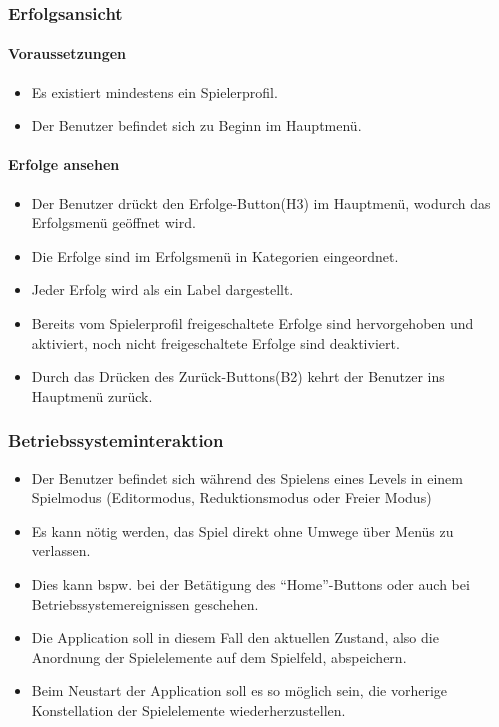 \subsubsection{Erfolgsansicht}
\paragraph{Voraussetzungen}
\begin{itemize}
	\item Es existiert mindestens ein Spielerprofil.
	\item Der Benutzer befindet sich zu Beginn im Hauptmenü.
\end{itemize}
\paragraph{Erfolge ansehen}
\begin{itemize}
	\item Der Benutzer drückt den Erfolge-Button(H3) im Hauptmenü, wodurch das Erfolgsmenü geöffnet wird.
	\item Die Erfolge sind im Erfolgsmenü in Kategorien eingeordnet.
	\item Jeder Erfolg wird als ein Label dargestellt.
	\item Bereits vom Spielerprofil freigeschaltete Erfolge sind hervorgehoben und aktiviert, noch nicht freigeschaltete Erfolge sind deaktiviert.
	\item Durch das Drücken des Zurück-Buttons(B2) kehrt der Benutzer ins Hauptmenü zurück.
\end{itemize}


\subsubsection{Betriebssysteminteraktion}
\begin{itemize}
	\item Der Benutzer befindet sich während des Spielens eines Levels in einem Spielmodus (Editormodus, Reduktionsmodus oder Freier Modus) %
	\item Es kann nötig werden, das Spiel direkt ohne Umwege über Menüs zu verlassen.
	\item Dies kann bspw. bei der Betätigung des "`Home"'-Buttons  oder auch bei Betriebssystemereignissen geschehen.
	\item Die Application soll in diesem Fall den aktuellen Zustand, also die Anordnung der Spielelemente auf dem Spielfeld, abspeichern.
	\item Beim Neustart der Application soll es so möglich sein, die vorherige Konstellation der Spielelemente wiederherzustellen.
\end{itemize}

